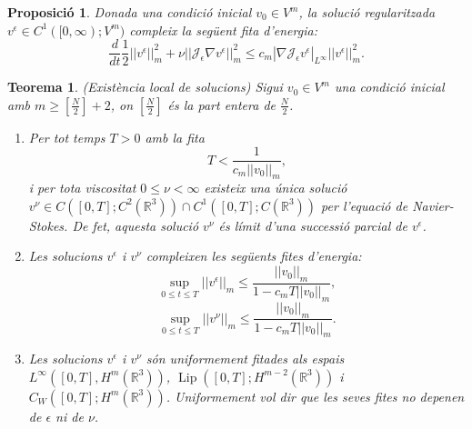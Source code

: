 \documentclass{article}
\numberwithin{equation}{section}
\DeclareMathOperator{\Lip}{Lip}
\newtheorem{teorema}{Teorema}[section]
\newtheorem{proposicio}{Proposici\'{o}}[section]
\begin{document}
\begin{proposicio}
Donada una condici\'{o} inicial $v_0\in V^m$, la soluci\'{o} regularitzada $v^{\epsilon}\in C^1([0,\infty);V^m)$ compleix la seg\"{u}ent fita d'energia:
\begin{equation}\label{Equ. limit aleatori}
\frac{d}{dt}\frac{1}{2}||v^{\epsilon}||_m^2+\nu||\mathcal{J}_{\epsilon}\nabla v^{\epsilon}||_m^2\leq c_m|\nabla\mathcal{J}_{\epsilon}v^{\epsilon}|_{L^{\infty}}||v^{\epsilon}||_m^2.
\end{equation}
\end{proposicio}

\begin{teorema}\label{Teo: existencia}
(Exist\`{e}ncia local de solucions) Sigui $v_0\in V^m$ una condici\'{o} inicial amb $m\geq\left[\frac{N}{2}\right]+2$, on $\left[\frac{N}{2}\right]$ \'{e}s la part entera de $\frac{N}{2}$.
\begin{enumerate}
\item Per tot temps $T>0$ amb la fita
\begin{equation}\label{Equ. existencia 1}
T<\frac{1}{c_m||v_0||_m},
\end{equation}
i per tota viscositat $0\leq\nu<\infty$ existeix una \'{u}nica soluci\'{o} $v^{\nu}\in C([0,T];C^2(\mathbb{R}^3))\cap C^1([0,T];C(\mathbb{R}^3))$ per l'equaci\'{o} de Navier-Stokes. De fet, aquesta soluci\'{o} $v^{\nu}$ \'{e}s l\'{i}mit d'una successi\'{o} parcial de $v^{\epsilon}$.
\item Les solucions $v^{\epsilon}$ i $v^{\nu}$ compleixen les seg\"{u}ents fites d'energia:
\begin{equation}
\sup_{0\leq t\leq T}||v^{\epsilon}||_m\leq\frac{||v_0||_m}{1-c_mT||v_0||_m},
\end{equation}
\begin{equation}
\sup_{0\leq t\leq T}||v^{\nu}||_m\leq\frac{||v_0||_m}{1-c_mT||v_0||_m}.
\end{equation}
\item Les solucions $v^{\epsilon}$ i $v^{\nu}$ s\'{o}n uniformement fitades als espais $L^{\infty}([0,T],H^m(\mathbb{R}^3))$, $\Lip([0,T];H^{m-2}(\mathbb{R}^3))$ i\\
$C_W([0,T];H^m(\mathbb{R}^3))$. Uniformement vol dir que les seves fites no depenen de $\epsilon$ ni de $\nu$.
\end{enumerate}
\end{teorema}
\end{document}
